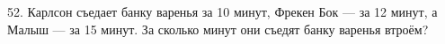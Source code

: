 52. Карлсон съедает банку варенья за 10 минут, Фрекен Бок --- за 12 минут, а Малыш --- за 15 минут. За сколько минут они съедят банку варенья втроём?\\
